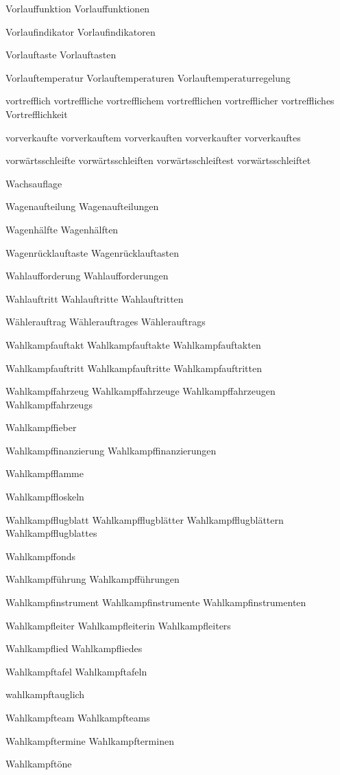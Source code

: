 Vorlauffunktion
Vorlauffunktionen

Vorlaufindikator 
Vorlaufindikatoren

Vorlauftaste
Vorlauftasten

Vorlauftemperatur
Vorlauftemperaturen
Vorlauftemperaturregelung

vortrefflich
vortreffliche
vortrefflichem
vortrefflichen
vortrefflicher
vortreffliches
Vortrefflichkeit

vorverkaufte
vorverkauftem
vorverkauften
vorverkaufter
vorverkauftes

vorwärtsschleifte
vorwärtsschleiften
vorwärtsschleiftest
vorwärtsschleiftet

Wachsauflage

Wagenaufteilung
Wagenaufteilungen

Wagenhälfte
Wagenhälften

Wagenrücklauftaste
Wagenrücklauftasten

Wahlaufforderung
Wahlaufforderungen

Wahlauftritt
Wahlauftritte
Wahlauftritten

Wählerauftrag
Wählerauftrages
Wählerauftrags

Wahlkampfauftakt
Wahlkampfauftakte
Wahlkampfauftakten

Wahlkampfauftritt
Wahlkampfauftritte
Wahlkampfauftritten

Wahlkampffahrzeug
Wahlkampffahrzeuge
Wahlkampffahrzeugen
Wahlkampffahrzeugs

Wahlkampffieber

Wahlkampffinanzierung
Wahlkampffinanzierungen

Wahlkampfflamme

Wahlkampffloskeln

Wahlkampfflugblatt
Wahlkampfflugblätter
Wahlkampfflugblättern
Wahlkampfflugblattes

Wahlkampffonds

Wahlkampfführung
Wahlkampfführungen

Wahlkampfinstrument
Wahlkampfinstrumente
Wahlkampfinstrumenten

Wahlkampfleiter
Wahlkampfleiterin
Wahlkampfleiters

Wahlkampflied
Wahlkampfliedes

Wahlkampftafel
Wahlkampftafeln

wahlkampftauglich

Wahlkampfteam
Wahlkampfteams

Wahlkampftermine
Wahlkampfterminen

Wahlkampftöne

